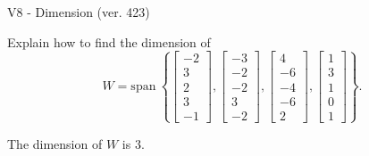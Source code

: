 \begin{exercise}
  \begin{exerciseTitle}V8 - Dimension (ver. 423)\end{exerciseTitle}
  \begin{exerciseStatement}
    Explain how to find the dimension of 
\[W=\mathrm{span}\ \left\{\left[\begin{array}{r}
-2 \\
3 \\
2 \\
3 \\
-1
\end{array}\right] , \left[\begin{array}{r}
-3 \\
-2 \\
-2 \\
3 \\
-2
\end{array}\right] , \left[\begin{array}{r}
4 \\
-6 \\
-4 \\
-6 \\
2
\end{array}\right] , \left[\begin{array}{r}
1 \\
3 \\
1 \\
0 \\
1
\end{array}\right]\right\}.\]



  \end{exerciseStatement}
  \begin{exerciseAnswer}
   The dimension of \(W\) is  \(3\).
  


  \end{exerciseAnswer}
\end{exercise}